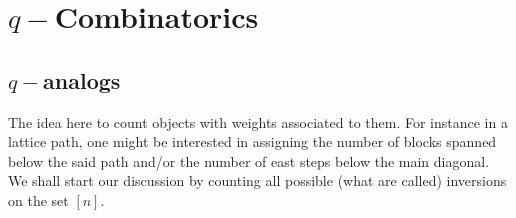 \chapter{\texorpdfstring{$q-$}-Combinatorics}
\section{\texorpdfstring{$q-$}-analogs}
The idea here to count objects with weights associated to them. For instance in a lattice path, one might be interested in assigning the number of blocks spanned below the said path and/or the number of east steps below the main diagonal. We shall start our discussion by counting all possible (what are called) inversions on the set $[n]$.

